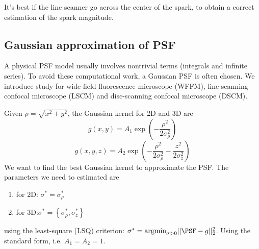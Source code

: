 It's best if the line scanner go across the
center of the spark, to obtain a correct estimation of the spark
magnitude.


\subsection{Gaussian approximation of PSF}

A physical PSF model usually involves nontrivial terms (integrals and infinite
series). To avoid these computational work, a Gaussian PSF is often chosen. We
introduce \citep{zhang2007} study for wide-field fluorescence microscope (WFFM),
line-scanning confocal microscope (LSCM) and disc-scanning confocal microscope
(DSCM). 

Given $\rho = \sqrt{x^2+y^2}$, the Gaussian kernel for 2D and 3D are
\begin{equation}
g(x,y) = A_1 \exp\left( -\frac{\rho^2}{2\sigma_\rho^2} \right)
\end{equation}
\begin{equation}
g(x,y,z) = A_2 \exp\left( -\frac{\rho^2}{2\sigma_\rho^2}
-\frac{z^2}{2\sigma_z^2} \right)
\end{equation}
We want to find the best Gaussian kernel to approximate the PSF. The parameters
we need to estimated are
\begin{enumerate}
  \item for 2D: $\sigma^*=\sigma_\rho^*$
  \item for 3D:$\sigma^*=\left\{\sigma_\rho^*,\sigma_z^*\right\}$
\end{enumerate}
using the least-square (LSQ) criterion:
$\sigma^*=\text{argmin}_{\sigma>0}||\PSF-g||_2^2$. Using the standard form, i.e.
$A_1=A_2=1$.

